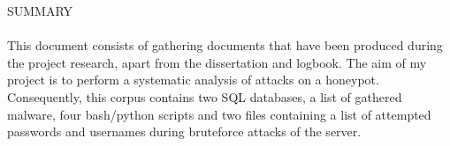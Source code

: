 \textsc{SUMMARY}\\[0.5cm]

\paragraph{}
This document consists of gathering documents that have been produced during the
project research, apart from the dissertation and logbook. The aim of my project is to
perform a systematic analysis of attacks on a honeypot. Consequently, this corpus contains
two SQL databases, a list of gathered malware, four bash/python scripts and two files containing a
list of attempted passwords and usernames during bruteforce attacks of the server.

\newpage
